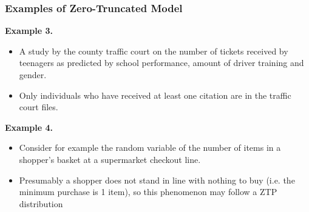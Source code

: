 \documentclass[MASTER.tex]{subfiles}
\begin{document}
\begin{frame}
	\frametitle{Examples of Zero-Truncated Model}
	\textbf{Example 3.}
	\begin{itemize} 
		\item A study by the county traffic court on the number of tickets received by teenagers as predicted by school performance, amount of driver training and gender.
		\item Only individuals who have received at least one citation are in the traffic court files.
	\end{itemize}

	\textbf{Example 4.}
\begin{itemize}
	\item 
Consider for example the random variable of the number of items in a shopper's basket at a supermarket checkout line. 
\item Presumably a shopper does not stand in line with nothing to buy (i.e. the minimum purchase is 1 item), so this phenomenon may follow a ZTP distribution
	\end{itemize}
\end{frame}
\end{document}
